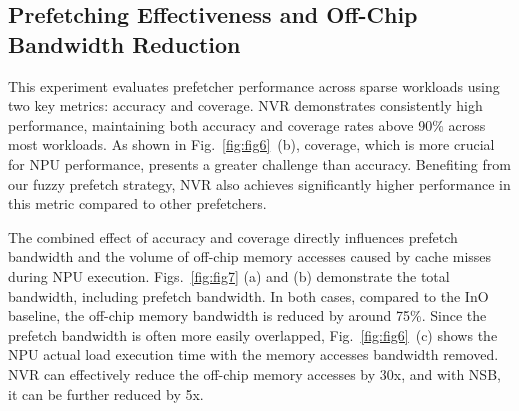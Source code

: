 \vspace{-5pt}
\subsection{Prefetching Effectiveness and Off-Chip Bandwidth Reduction}
\vspace{-3pt}


This experiment evaluates prefetcher performance across sparse workloads using two key metrics: accuracy and coverage. NVR demonstrates consistently high performance, maintaining both accuracy and coverage rates above 90\% across most workloads. As shown in Fig.~\ref{fig:fig6}~(b), coverage, which is more crucial for NPU performance, presents a greater challenge than accuracy. Benefiting from our fuzzy prefetch strategy, NVR also achieves significantly higher performance in this metric compared to other prefetchers.

The combined effect of accuracy and coverage directly influences prefetch bandwidth and the volume of off-chip memory accesses caused by cache misses during NPU execution.
Figs.~\ref{fig:fig7} (a) and (b) demonstrate the total bandwidth, including prefetch bandwidth. In both cases, compared to the InO baseline, the off-chip memory bandwidth is reduced by around 75\%.
Since the prefetch bandwidth is often more easily overlapped, Fig.~\ref{fig:fig6}~(c) shows the NPU actual load execution time with the memory accesses bandwidth removed. NVR can effectively reduce the off-chip memory accesses by 30x, and with NSB, it can be further reduced by 5x.






